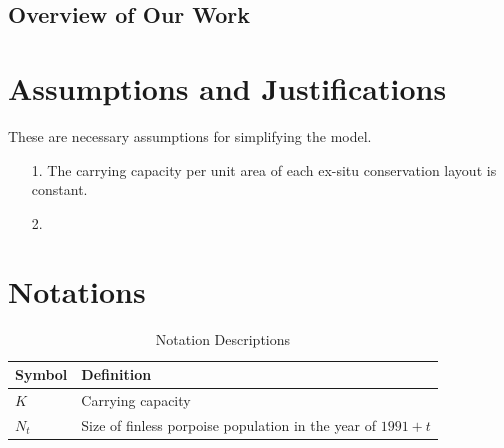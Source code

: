 \documentclass{mcmthesis}
\numberwithin{figure}{section}
\numberwithin{table}{section}
\numberwithin{equation}{section}
\begin{document}
\subsection{Overview of Our Work}




\section{Assumptions and Justifications}
These are necessary assumptions for simplifying the model.
\begin{enumerate}
  \item [1.] The carrying capacity per unit area of each ex-situ conservation layout is constant.
  \item [2.] 
\end{enumerate}


\section{Notations}

\renewcommand\arraystretch{1.5}

\begin{table}[htpb!]
  \centering
  \caption{Notation Descriptions} \label{Notation}
  \begin{tabular}{m{2.5cm}<{\centering}|m{12.5cm}<{\centering}}
  \toprule[1.5pt]
  \textbf{Symbol} & \textbf{Definition} \\ \hline
   $ K $ & Carrying capacity \\ 
   $ N_t $ & Size of finless porpoise population in the year of $ 1991 + t $ \\ 
  \bottomrule[1.5pt]
  \end{tabular}
  \end{table}
\end{document}
